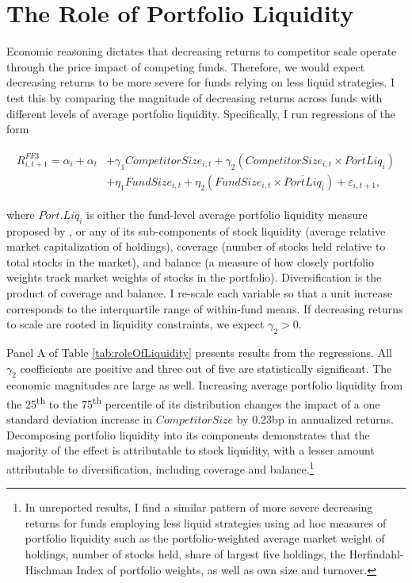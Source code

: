 \documentclass[openany]{book}
\let\rmarkdownfootnote\footnote%
\def\footnote{\protect\rmarkdownfootnote}
\theoremstyle{definition}
\theoremstyle{definition}
\theoremstyle{definition}
\theoremstyle{remark}
\begin{document}
\section{The Role of Portfolio Liquidity}\label{sec:heterogeneity}

Economic reasoning dictates that decreasing returns to competitor scale
operate through the price impact of competing funds. Therefore, we would
expect decreasing returns to be more severe for funds relying on less
liquid strategies. I test this by comparing the magnitude of decreasing
returns across funds with different levels of average portfolio
liquidity. Specifically, I run regressions of the form

\begin{align}
\begin{split}
R^{FF3}_{i,t+1} = \alpha_i + \alpha_t &+ \gamma_1 CompetitorSize_{i,t} + \gamma_2 \left( CompetitorSize_{i,t} \times \overline{PortLiq}_{i} \right) \\ 
&+ \eta_1 FundSize_{i,t} + \eta_2 \left( FundSize_{i,t} \times \overline{PortLiq}_i \right) + \varepsilon_{i,t+1},
\end{split}
\label{eq:AvgLiqReg}
\end{align}

where \(\overline{Port.Liq}_i\) is either the fund-level average
portfolio liquidity measure proposed by \citet{pst17L}, or any of its
sub-components of stock liquidity (average relative market
capitalization of holdings), coverage (number of stocks held relative to
total stocks in the market), and balance (a measure of how closely
portfolio weights track market weights of stocks in the portfolio).
Diversification is the product of coverage and balance. I re-scale each
variable so that a unit increase corresponds to the interquartile range
of within-fund means. If decreasing returns to scale are rooted in
liquidity constraints, we expect \(\gamma_2>0\).

Panel A of Table \ref{tab:roleOfLiquidity} presents results from the
regressions. All \(\gamma_2\) coefficients are positive and three out of
five are statistically significant. The economic magnitudes are large as
well. Increasing average portfolio liquidity from the
25\textsuperscript{th} to the 75\textsuperscript{th} percentile of its
distribution changes the impact of a one standard deviation increase in
\(CompetitorSize\) by 0.23bp in annualized returns. Decomposing
portfolio liquidity into its components demonstrates that the majority
of the effect is attributable to stock liquidity, with a lesser amount
attributable to diversification, including coverage and
balance.\footnote{In unreported results, I find a similar pattern of
  more severe decreasing returns for funds employing less liquid
  strategies using ad hoc measures of portfolio liquidity such as the
  portfolio-weighted average market weight of holdings, number of stocks
  held, share of largest five holdings, the Herfindahl-Hischman Index of
  portfolio weights, as well as own size and turnover.}
\end{document}

